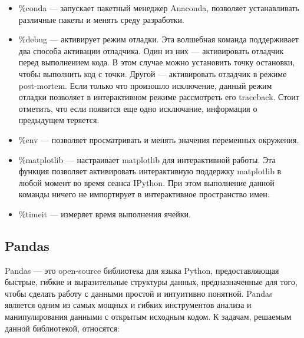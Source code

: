\begin{itemize}
	\item \%conda --- запускает пакетный менеджер Anaconda, позволяет устанавливать различные пакеты и менять среду разработки.
	\item \%debug --- активирует режим отладки. Эта волшебная команда поддерживает два способа активации отладчика. Один из них --- активировать отладчик перед выполнением кода. В этом случае можно установить точку остановки, чтобы выполнить код с точки. Другой --- активировать отладчик в режиме post-mortem. Если только что произошло исключение, данный режим отладки позволяет в интерактивном режиме рассмотреть его traceback. Стоит отметить, что если появится еще одно исключание, информация о предыдущем теряется.
	\item \%env --- позволяет просматривать и менять значения переменных окружения.
	\item \%matplotlib --- настраивает matplotlib для интерактивной работы. Эта функция позволяет активировать интерактивную поддержку matplotlib в любой момент во время сеанса IPython. При этом выполнение данной команды ничего не импортирует в интерактивное пространство имен.
	\item \%timeit --- измеряет время выполнения ячейки.
\end{itemize}


\subsection{Pandas}

Pandas --- это open-source библиотека для языка Python, предоставляющая быстрые, гибкие и выразительные структуры данных, предназначенные для того, чтобы сделать работу с данными простой и интуитивно понятной. Pandas является одним из самых мощных и гибких инструментов анализа и манипулирования данными с открытым исходным кодом. К задачам, решаемым данной библиотекой, относятся:

